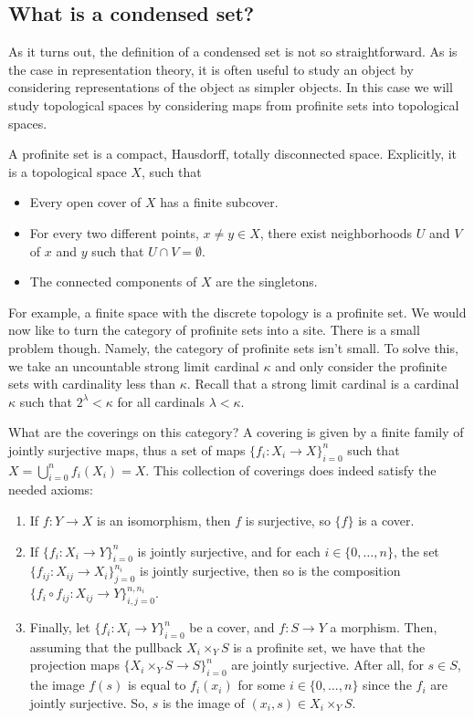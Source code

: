 \documentclass{article}
\begin{document}
\subsection{What is a condensed set?}
As it turns out, the definition of a condensed set is not so
straightforward. As is the case in representation theory,
it is often useful to study an object by considering
representations of the object as simpler objects. In
this case we will study topological spaces by considering
maps from profinite sets into topological spaces.
\begin{definition}
    A profinite set is a compact, Hausdorff, totally disconnected space.
    Explicitly, it is a topological space $X$, such that
    \begin{itemize}
        \item Every open cover of $X$ has a finite subcover.
        \item For every two different points, $x\neq y \in X$, there
              exist neighborhoods $U$ and $V$ of $x$ and $y$ such that $U\cap V = \emptyset$.
        \item The connected components of $X$ are the singletons.
    \end{itemize}
\end{definition}
For example, a finite space with the discrete topology is a profinite set.
We would now like to turn the category of profinite sets into
a site. There is a small problem though. Namely, the category
of profinite sets isn't small. To solve this, we
take an uncountable strong limit cardinal $\kappa$
and only consider the profinite sets with cardinality
less than $\kappa$. Recall that a strong limit
cardinal is a cardinal $\kappa$ such that
$2^\lambda < \kappa$ for all cardinals $\lambda < \kappa$.

What are the coverings on this category? A covering
is given by a finite family of jointly surjective
maps, thus a set of maps $\{f_i \colon X_i \to X\}_{i=0}^n$
such that $X = \bigcup_{i=0}^n f_i(X_i) = X$.
This collection of coverings does indeed satisfy the needed axioms:
\begin{enumerate}
    \item If $f\colon Y \to X$ is an isomorphism, then $f$ is surjective,
          so $\{f\}$ is a cover.
    \item If $\{f_i \colon X_i \to Y\}_{i=0}^n$ is jointly surjective, and
          for each $i \in \{0, \dots, n\}$, the set $\{f_{ij}\colon X_{ij} \to X_i \}_{j=0}^{n_i}$
          is jointly surjective, then so is the composition
          $\{f_i \circ f_{ij}\colon X_{ij} \to Y\}_{i,j=0}^{n, n_i}$.
    \item Finally, let $\{f_i \colon X_i \to Y\}_{i= 0}^n$ be a cover, and
          $f\colon S \to Y$ a morphism. Then, assuming that the pullback
          $X_i \times_Y S$ is a profinite set, we have that the
          projection maps $\{X_i \times_Y S \to S\}_{i=0}^n$ are jointly surjective.
          After all, for $s\in S$, the image $f(s)$ is equal to $f_i(x_i)$ for some
          $i \in \{0, \dots, n\}$ since the $f_i$ are jointly surjective.
          So, $s$ is the image of $(x_i, s) \in X_i \times_Y S$.
\end{enumerate}
\end{document}
